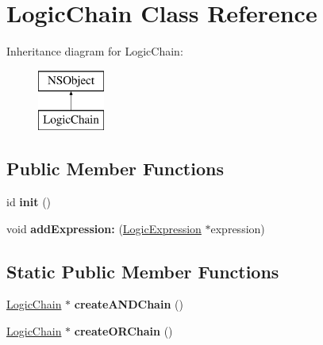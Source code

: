\hypertarget{interface_logic_chain}{
\section{\-Logic\-Chain \-Class \-Reference}
\label{interface_logic_chain}
}
\-Inheritance diagram for \-Logic\-Chain\-:\begin{figure}[H]
\begin{center}
\leavevmode
\includegraphics[height=2.000000cm]{interface_logic_chain}
\end{center}
\end{figure}
\subsection*{\-Public \-Member \-Functions}
\begin{DoxyCompactItemize}
\item 
\hypertarget{interface_logic_chain_acfb21aa2a9108268a50f58e2e6807d02}{
id {\bfseries init} ()}
\label{interface_logic_chain_acfb21aa2a9108268a50f58e2e6807d02}

\item 
\hypertarget{interface_logic_chain_a25d4c0434149faf94ee508613e71945e}{
void {\bfseries add\-Expression\-:} (\hyperlink{interface_logic_expression}{\-Logic\-Expression} $\ast$expression)}
\label{interface_logic_chain_a25d4c0434149faf94ee508613e71945e}

\end{DoxyCompactItemize}
\subsection*{\-Static \-Public \-Member \-Functions}
\begin{DoxyCompactItemize}
\item 
\hypertarget{interface_logic_chain_a0463749d3459c1c680043392ff7bc185}{
\hyperlink{interface_logic_chain}{\-Logic\-Chain} $\ast$ {\bfseries create\-A\-N\-D\-Chain} ()}
\label{interface_logic_chain_a0463749d3459c1c680043392ff7bc185}

\item 
\hypertarget{interface_logic_chain_a41442c8d77cbf064a8bcee9fa39ad738}{
\hyperlink{interface_logic_chain}{\-Logic\-Chain} $\ast$ {\bfseries create\-O\-R\-Chain} ()}
\label{interface_logic_chain_a41442c8d77cbf064a8bcee9fa39ad738}

\end{DoxyCompactItemize}
